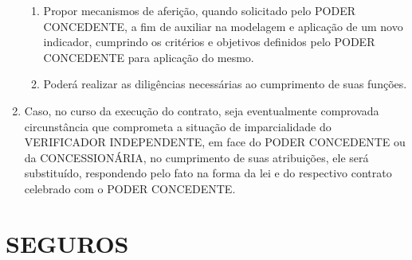\documentclass[a4paper,11pt]{report} %
\begin{document}
\begin{enumerate}
\begin{enumerate}[label*=\arabic*.]
\item \label{itm:2JJY} Propor mecanismos de aferição, quando solicitado pelo PODER CONCEDENTE, a fim de auxiliar na modelagem e aplicação de um novo indicador, cumprindo os critérios e objetivos definidos pelo PODER CONCEDENTE para aplicação do mesmo. 

\item \label{itm:QTLK} Poderá realizar as diligências necessárias ao cumprimento de suas funções. 
\end{enumerate}

\item \label{itm:3K6G} Caso, no curso da execução do contrato, seja eventualmente comprovada circunstância que comprometa a situação de imparcialidade do VERIFICADOR INDEPENDENTE, em face do PODER CONCEDENTE ou da CONCESSIONÁRIA, no cumprimento de suas atribuições, ele será substituído, respondendo pelo fato na forma da lei e do respectivo contrato celebrado com o PODER CONCEDENTE.
\end{enumerate}

\section{SEGUROS}
\label{sec:S9GS}
\end{document}
